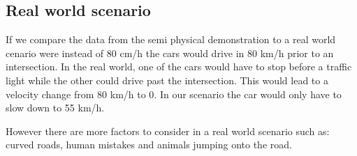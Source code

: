\subsection{Real world scenario}

If we compare the data from the semi physical demonstration to a real world cenario were instead of 80 cm/h the cars would drive in 80 km/h prior to an intersection. In the real world, one of the cars would have to stop before a traffic light while the other could drive past the intersection. This would lead to a velocity change from 80 km/h to 0. In our scenario the car would only have to slow down to 55 km/h.

However there are more factors to consider in a real world scenario such as: curved roads, human mistakes and animals jumping onto the road.